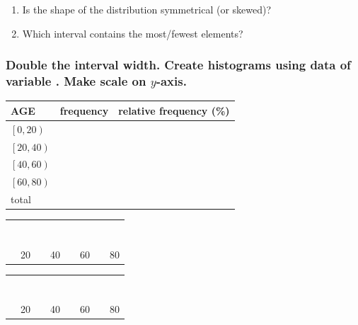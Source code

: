 \begin{enumerate}
\item Is the shape of the distribution symmetrical (or skewed)?
\item Which interval contains the most/fewest elements?
\end{enumerate}

\subsubsection*{Double the interval width. Create histograms using data of variable . Make scale on $y$-axis.}


	
	\begin{center}\small
		\begin{tabular}{l|l|l}
		\toprule
		AGE		& frequency	& relative frequency (\%)\\
		\midrule		
	$\left[0,20\right)$&&\\
	$\left[20,40\right)$&&\\
	$\left[40,60\right)$&&\\
	$\left[60,80\right)$&&\\		
		\midrule
		total&&\\
		\bottomrule
		\end{tabular}		
		\hfill\footnotesize
		\begin{tabular}{|llllllll}
		&&\\\\\\\\\\\\\\
		\hline
		\multicolumn{1}{l}{}& 20 && 40 && 60 && 80
		\end{tabular}
		\hfill
		\begin{tabular}{|llllllll}
		&&\\\\\\\\\\\\\\
		\hline
		\multicolumn{1}{l}{}& 20 && 40 && 60 && 80
		\end{tabular}
	\end{center}


